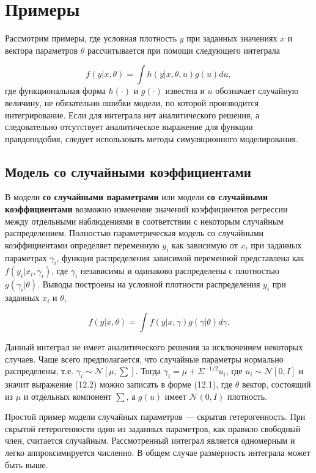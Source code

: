 \section{Примеры}

Рассмотрим примеры, где условная плотность $y$ при заданных значениях $x$ и вектора параметров $\theta$ рассчитывается при помощи следующего интеграла

\begin{equation}
f(y|x,\theta)=\int{h(y|x,\theta,u)g(u)du},
\end{equation}
где функциональная форма $h(\cdot)$ и $g(\cdot)$ известна и $u$ обозначает случайную величину, не обязательно ошибки модели, по которой производится интегрирование. Если для интеграла нет аналитического решения, а следовательно отсутствует аналитическое выражение для функции правдоподобия, следует использовать методы симуляционного моделирования.

\subsection{Модель со случайными коэффициентами}

В модели \textbf{со случайными параметрами} или модели \textbf{со случайными коэффициентами} возможно изменение значений коэффициентов регрессии между отдельными наблюдениями в соответствии с некоторым случайным распределением. Полностью параметрическая модель со случайными коэффициентами определяет переменную $y_i$ как зависимую от $x_i$ при заданных параметрах $\gamma_i$, функция распределения зависимой переменной представлена как $f(y_i|x_i,\gamma_i)$, где $\gamma_i$ независимы и одинаково распределены  с плотностью $g(\gamma_i|\theta)$. Выводы построены на условной плотности распределения $y_i$ при заданных $x_i$ и  $\theta$,

\begin{equation}
f(y|x,\theta)=\int{f(y|x,\gamma)g(\gamma|\theta)d\gamma}.
\end{equation}

Данный интеграл не имеет аналитического решения за исключением некоторых случаев. Чаще всего предполагается, что случайные параметры нормально распределены, т.е. $\gamma_{i}{\sim }\mathcal{N}[\mu,\sum]$.  Тогда $\gamma_{i}=\mu+\Sigma^{-1/2}u_{i}$, где $u_{i}{\sim }\mathcal{N}[0,I]$ и значит выражение (12.2) можно записать в форме (12.1), где $\theta$ вектор, состоящий из $\mu$ и отдельных компонент $\sum$, а $g(u)$ имеет $\mathcal{N}(0,I)$ плотность.

Простой пример модели случайных параметров --- скрытая гетерогенность. При скрытой гетерогенности  один из  заданных параметров, как правило свободный член, считается случайным. Рассмотренный интеграл является одномерным и легко аппроксимируется численно. В общем случае размерность интеграла может быть выше. 

